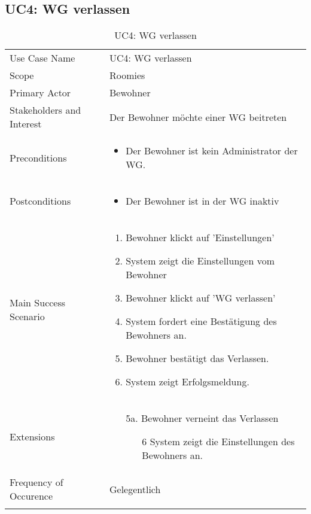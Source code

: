 \subsection{UC4: WG verlassen}
\begin{table}[H]
	\tablestyle
	\tablealtcolored
	\begin{tabularx}{\textwidth}{lX}
		\tablebody
			Use Case Name &
			UC4: WG verlassen
			\tabularnewline
			Scope &
			Roomies
			\tabularnewline
			Primary Actor &
			Bewohner
			\tabularnewline
			Stakeholders and Interest &
			Der Bewohner möchte einer WG beitreten
			\tabularnewline
			Preconditions &
			\begin{itemize}
				\item Der Bewohner ist kein Administrator der WG.
			\end{itemize}
			\tabularnewline
			Postconditions &
			\begin{itemize}
				\item Der Bewohner ist in der WG inaktiv
			\end{itemize}
			\tabularnewline
			Main Success Scenario &
			\begin{enumerate}
				\item Bewohner klickt auf 'Einstellungen'
				\item System zeigt die Einstellungen vom Bewohner
				\item Bewohner klickt auf 'WG verlassen'
				\item System fordert eine Bestätigung des Bewohners an.
				\item Bewohner bestätigt das Verlassen.
				\item System zeigt Erfolgsmeldung.
			\end{enumerate}
			\tabularnewline
			Extensions &
			\begin{itemize}
				\item[5a.] Bewohner verneint das Verlassen
				\begin{itemize}
					\item[6] System zeigt die Einstellungen des Bewohners an.
				\end{itemize}
			\end{itemize}
			\tabularnewline
			Frequency of Occurence &
			Gelegentlich
			\tabularnewline
		\tableend
	\end{tabularx}
	\caption{UC4: WG verlassen}
\end{table}


